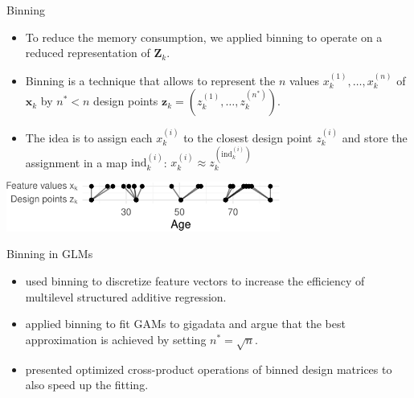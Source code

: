 \documentclass[ignorenonframetext,]{beamer}
\providecommand{\tightlist}{%
  \setlength{\itemsep}{0pt}\setlength{\parskip}{0pt}}
\newcommand{\xv}{\bm{x}}
\begin{document}
\begin{frame}{Binning}
\protect\hypertarget{binning}{}
\begin{itemize}
\tightlist
\item
  To reduce the memory consumption, we applied binning to operate on a
  reduced representation of \(\bm{Z}_k\).
\item
  Binning is a technique that allows to represent the \(n\) values
  \(x_k^{(1)}, \dots, x_k^{(n)}\) of \(\xv_k\) by \(n^\ast < n\) design
  points \(\bm{z}_k = (z_k^{(1)}, \dots, z_k^{(n^\ast)})\).
\item
  The idea is to assign each \(x_k^{(i)}\) to the closest design point
  \(z_k^{(i)}\) and store the assignment in a map
  \(\text{ind}_k^{(i)}\):
  \(x_k^{(i)} \approx z_k^{(\text{ind}_k^{(i)})}\)
\end{itemize}

\begin{center}\includegraphics[width=9cm]{figures/unnamed-chunk-3-1} \end{center}
\end{frame}

\begin{frame}{Binning in GLMs}
\protect\hypertarget{binning-in-glms}{}
\begin{itemize}
\item
  \citet{lang2014multilevel} used binning to discretize feature vectors
  to increase the efficiency of multilevel structured additive
  regression.
\item
  \citet{wood2017gigadata} applied binning to fit GAMs to gigadata and
  argue that the best approximation is achieved by setting
  \(n^\ast = \sqrt{n}\).
\item
  \citet{li2020faster} presented optimized cross-product operations of
  binned design matrices to also speed up the fitting.
\end{itemize}
\end{frame}
\end{document}
